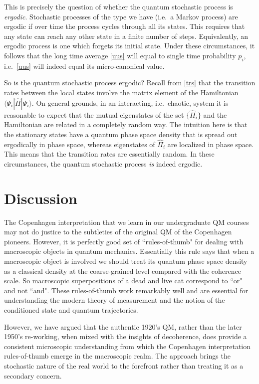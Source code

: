 \documentclass[12pt]{article}
\theoremstyle{plain}
\theoremstyle{definition}
\theoremstyle{remark}
\def\bra#1{\langle #1|}
\def\ket#1{| #1\rangle}
\begin{document}
This is precisely the question of whether the quantum stochastic process is {\it ergodic\/}. Stochastic processes of the type we have (i.e.~a Markov process) are ergodic if over time the process cycles through all its states. This requires that any state can reach any other state in a finite number of steps. Equivalently, an ergodic process is one which forgets its initial state. Under these circumstances, it follows that the long time average \eqref{uus} will equal to single time probability $p_i$, i.e.~\eqref{uus} will indeed equal its micro-canonical value.

So is the quantum stochastic process ergodic? Recall from \eqref{trs} that the transition rates between the local states involve the matrix element of the Hamiltonian $\bra{\Psi_i}\hat H\ket{\Psi_i}$. On general grounds, in an interacting, i.e.~chaotic, system it is reasonable to expect that the mutual eigenstates of the set $\{\hat\Pi_i\}$ and the Hamiltonian are related in a completely random way. The intuition here is that the stationary states have a quantum phase space density that is spread out ergodically in phase space, whereas eigenstates of $\hat\Pi_i$ are localized in phase space. This means that the transition rates are essentially random. In these circumstances, the quantum stochastic process {\it is\/} indeed ergodic.

\section{Discussion}\label{s9}

The Copenhagen interpretation that we learn in our undergraduate QM courses may not do justice to the subtleties of the original QM of the Copenhagen pioneers. However, it is perfectly good set of ``rules-of-thumb" for dealing with macroscopic objects in quantum mechanics. Essentially this rule says that when a macroscopic object is involved we should treat its quantum phase space density as a classical density at the coarse-grained level compared with the coherence scale. So macroscopic superpositions of a dead and live cat correspond to ``or" and not ``and". These rules-of-thumb work remarkably  well and are essential for understanding the modern theory of measurement and the notion of the conditioned state and quantum trajectories. 

However, we have argued that the authentic 1920's QM, rather than the later 1950's re-working, when mixed with the insights of decoherence, does provide a consistent microscopic understanding from which the Copenhagen interpretation rules-of-thumb emerge in the macroscopic realm. The approach brings the stochastic nature of the real world to the forefront rather than treating it as a secondary concern.
\end{document}
